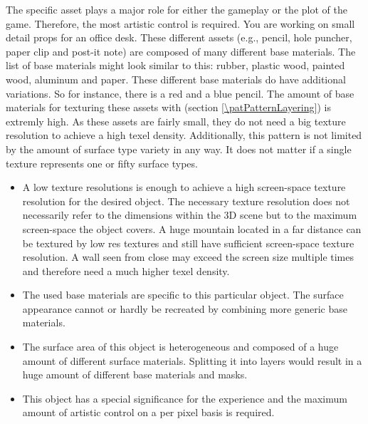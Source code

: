 \begin{description}
	The specific asset plays a major role for either the gameplay or the plot of the game. Therefore, the most artistic control is required. You are working on small detail props for an office desk. These different assets (e.g., pencil, hole puncher, paper clip and post-it note) are composed of many different base materials. The list of base materials might look similar to this: rubber, plastic wood, painted wood, aluminum and paper. These different base materials do have additional variations. So for instance, there is a red and a blue pencil. The amount of base materials for texturing these assets with \emph{\patPatternLayering} (section \ref{\patPatternLayering}) is extremly high. As these assets are fairly small, they do not need a big texture resolution to achieve a high texel density. Additionally, this pattern is not limited by the amount of surface type variety in any way. It does not matter if a single texture represents one or fifty surface types. 
	\item[\patApplicability:]\hfill
	\begin{itemize}\mynobreakpar
		\item A low texture resolutions is enough to achieve a high screen-space texture resolution for the desired object. The necessary texture resolution does not necessarily refer to the dimensions within the 3D scene but to the maximum screen-space the object covers. A huge mountain located in a far distance can be textured by low res textures and still have sufficient screen-space texture resolution. A wall seen from close may exceed the screen size multiple times and therefore need a much higher texel density.
		\item The used base materials are specific to this particular object. The surface appearance cannot or hardly be recreated by combining more generic base materials. 
		\item The surface area of this object is heterogeneous and composed of a huge amount of different surface materials. Splitting it into layers would result in a huge amount of different base materials and masks. 
		\item This object has a special significance for the experience and the maximum amount of artistic control on a per pixel basis is required. 
	\end{itemize}  
	\item[\patImplementation:]%

\end{description}
